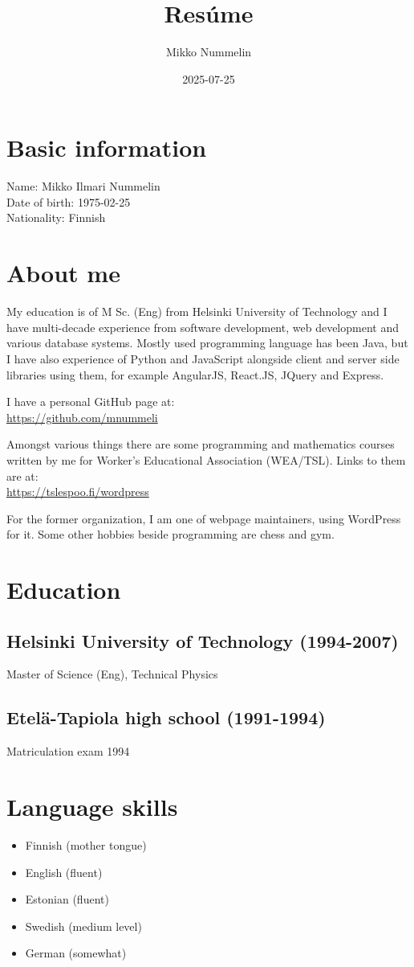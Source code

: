 \documentclass[a4paper,12pt]{article}
\title{Resúme}
\author{Mikko Nummelin}
\date{2025-07-25}
\begin{document}
\maketitle
\section*{Basic information}
Name: Mikko Ilmari Nummelin \\
Date of birth: 1975-02-25 \\
Nationality: Finnish
\section*{About me}
My education is of M Sc. (Eng) from Helsinki University of Technology and I have multi-decade experience from software development, web development and various database systems. Mostly used programming language has been Java, but I have also experience of Python and JavaScript alongside client and server side libraries using them, for example AngularJS, React.JS, JQuery and Express.

I have a personal GitHub page at:\\
\href{https://github.com/mnummeli}{https://github.com/mnummeli}

Amongst various things there are some programming and mathematics courses written by me for Worker's Educational Association (WEA/TSL). Links to them are at:\\
\href{https://tslespoo.fi/wordpress}{https://tslespoo.fi/wordpress}

For the former organization, I am one of webpage maintainers, using WordPress for it. Some other hobbies beside programming are chess and gym.
\section*{Education}
\subsection*{Helsinki University of Technology (1994-2007)}
Master of Science (Eng), Technical Physics
\subsection*{Etelä-Tapiola high school (1991-1994)}
Matriculation exam 1994
\section*{Language skills}
\begin{itemize}
\item{Finnish (mother tongue)}
\item{English (fluent)}
\item{Estonian (fluent)}
\item{Swedish (medium level)}
\item{German (somewhat)}
\end{itemize}
\end{document}
